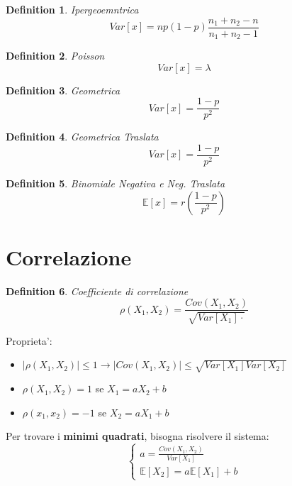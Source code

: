 \documentclass{article}
\newtheorem{definition}{Definition}[section]
\begin{document}
    \begin{definition} Ipergeoemntrica
        $$
        Var[x] = n p (1-p) \frac{n_1 + n_2 - n}{n_1 + n_2 - 1}
        $$
    \end{definition}

    \begin{definition} Poisson
        $$
        Var[x] = \lambda
        $$
    \end{definition}

    \begin{definition} Geometrica
        $$
        Var[x] = \frac{1-p}{p^2}
        $$
    \end{definition}

    \begin{definition} Geometrica Traslata
        $$
        Var[x] = \frac{1-p}{p^2}
        $$
    \end{definition}

    \begin{definition} Binomiale Negativa e Neg. Traslata
        $$
        \mathbb E[x] = r (\frac {1-p} {p^2})
        $$
    \end{definition}

    \newpage
    \section{Correlazione }
    \begin{definition} Coefficiente di correlazione
        $$
        \rho (X_1, X_2) = \frac {Cov(X_1, X_2)} {\sqrt{Var[X_1] \cdot }}
        $$
    \end{definition}

    Proprieta':
    \begin{itemize}
        \item $|\rho(X_1, X_2)| \leq 1 \to |Cov(X_1, X_2)| \leq \sqrt{Var[X_1]Var[X_2]}$
        \item $\rho(X_1,X_2) = 1$ se $X_1 = a X_2 + b$
        \item $\rho(x_1, x_2) = -1$ se $X_2 = a X_1 + b$
    \end{itemize}

    Per trovare i \textbf{minimi quadrati}, bisogna risolvere il sistema:
    $$
    \begin{cases}
        a = \frac{Cov(X_1, X_2)}{Var[X_1]} \\
        \mathbb E[X_2] = a \mathbb E[X_1] + b
    \end{cases}
    $$
\end{document}
